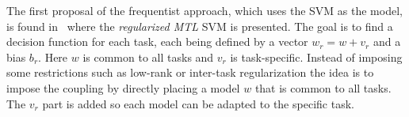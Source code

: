 The first proposal of the frequentist approach, which uses the SVM as the model, is found in~\cite{EvgeniouP04} where the \emph{regularized MTL} SVM is presented. The goal is to find a decision function for each task, each being defined by a vector
$w_r = w + v_r$
and a bias $b_r$.
Here $w$ is common to all tasks and $v_r$ is task-specific.
Instead of imposing some restrictions such as low-rank or inter-task regularization the idea is to impose the coupling by directly placing a model $w$ that is common to all tasks. The $v_r$ part is added so each model can be adapted to the specific task.
%

